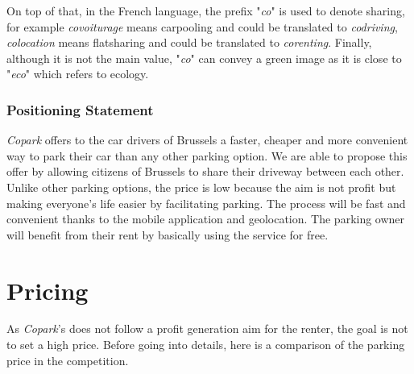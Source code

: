 \documentclass[12pt,a4paper,oneside]{book}
\newcommand{\bp}{\textit{Copark}}
\begin{document}
On top of that, in the French language, the prefix "\textit{co}" is used to denote sharing, for example \textit{covoiturage} means carpooling and could be translated to \textit{codriving}, \textit{colocation} means flatsharing and could be translated to \textit{corenting}. Finally, although it is not the main value, "\textit{co}" can convey a green image as it is close to "\textit{eco}" which refers to ecology.

\subsubsection{Positioning Statement}

\bp{} offers to the car drivers of Brussels a faster, cheaper and more convenient way to park their car than any other parking option. We are able to propose this offer by allowing citizens of Brussels to share their driveway between each other. Unlike other parking options, the price is low because the aim is not profit but making everyone's life easier by facilitating parking. The process will be fast and convenient thanks to the mobile application and geolocation. The parking owner will benefit from their rent by basically using the service for free. 

\section{Pricing}
\label{priceana}

As \bp{}'s does not follow a profit generation aim for the renter, the goal is not to set a high price. Before going into details, here is a comparison of the parking price in the competition.
\end{document}
